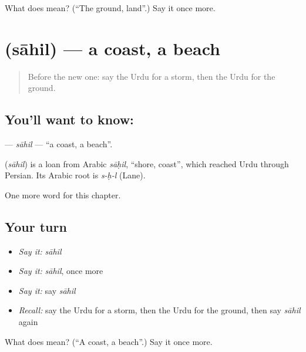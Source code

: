\begin{tcolorbox}[breakable,colback=teal!4,colframe=teal!35!black,title={Before you move on}]
What does  mean? (\textquotedblleft{}The ground, land\textquotedblright{}.) Say it once more.
\end{tcolorbox}
\section[\texorpdfstring{\ur{ساحل} (sāhil)}{ساحل (sāhil)}]{ (sāhil) — a coast, a beach}

\label{lesson:UR-C125-sahil}



\begin{quote}
Before the new one: say the Urdu for a storm, then the Urdu for the ground.
\end{quote}

\subsection*{You'll want to know: }
\textbf{} — \emph{sāhil} — \textquotedblleft{}a coast, a beach\textquotedblright{}.

\begin{cousinweb}
\textbf{} (\emph{sāhil}) is a loan from Arabic \emph{sāḥil}, \textquotedblleft{}shore, coast\textquotedblright{}, which reached Urdu through Persian. Its Arabic root is \emph{s-ḥ-l} (Lane).
\end{cousinweb}

\begin{grammarlens}[title={What you've built}]
One more word for this chapter.
\end{grammarlens}

\subsection*{Your turn}
\begin{itemize}
\raggedright
  \item \emph{Say it:} \emph{sāhil}
  \item \emph{Say it:} \emph{sāhil}, once more
  \item \emph{Say it:} say \emph{sāhil}
  \item \emph{Recall:} say the Urdu for a storm, then the Urdu for the ground, then say \emph{sāhil} again
\end{itemize}

\begin{tcolorbox}[breakable,colback=teal!4,colframe=teal!35!black,title={Before you move on}]
What does  mean? (\textquotedblleft{}A coast, a beach\textquotedblright{}.) Say it once more.
\end{tcolorbox}
